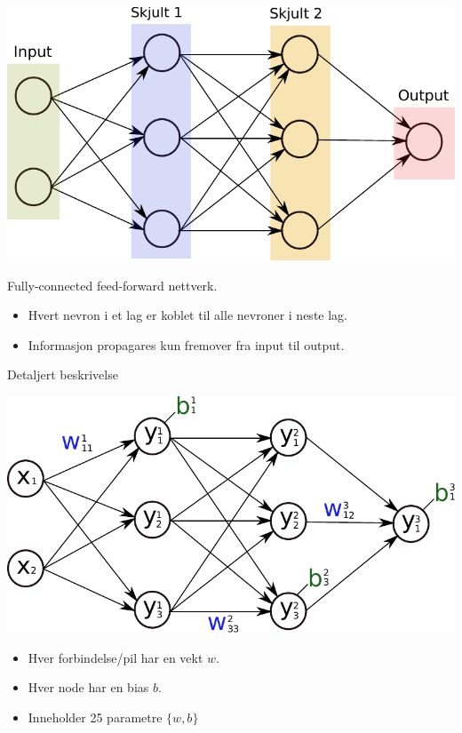 \documentclass{beamer}
\begin{document}
\begin{frame}
 
\centering
\includegraphics[width=0.8\linewidth]{../Figures/Presentation/networkGeneral.pdf}

\begin{block}{Fully-connected feed-forward nettverk.}
 \begin{itemize}
  \item Hvert nevron i et lag er koblet til alle nevroner i neste lag. 
  \item Informasjon propagares kun fremover fra input til output.
 \end{itemize}
\end{block}

\end{frame}


\begin{frame}{Detaljert beskrivelse}
 
\centering
\includegraphics[width=0.8\linewidth]{../Figures/Theory/networkWithNotationAltered.pdf}

\begin{itemize}
 \item Hver forbindelse/pil har en vekt $w$. 
 \item Hver node har en bias $b$.
 \item Inneholder 25 parametre $\{w,b\}$
\end{itemize}

\end{frame}
\end{document}
